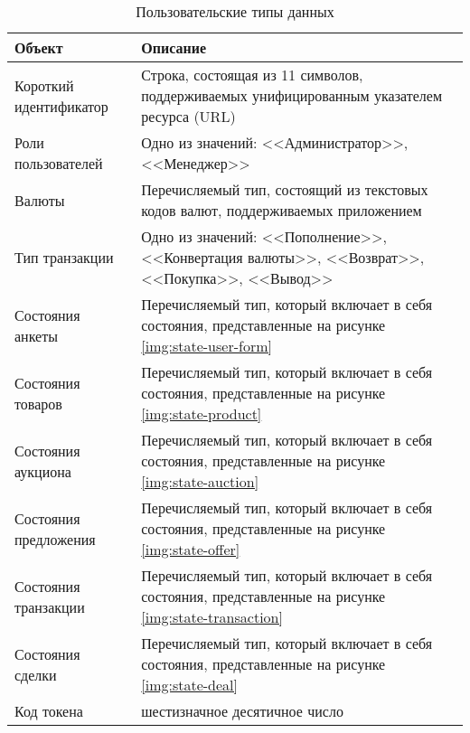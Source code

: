 \begin{table}[!th]
    \centering
    \caption{Пользовательские типы данных}
    \label{tab:db-types}
    \begin{tabular}{|p{5cm}|p{11cm}|}
         \hline
         \textbf{Объект} & \textbf{Описание} \\
         \hline
         Короткий идентификатор & Строка, состоящая из 11 символов, поддерживаемых унифицированным указателем ресурса (URL) \\
         \hline
         Роли пользователей & Одно из значений: <<Администратор>>, <<Менеджер>> \\
         \hline
         Валюты & Перечисляемый тип, состоящий из текстовых кодов валют, поддерживаемых приложением \\
         \hline
         Тип транзакции & Одно из значений: <<Пополнение>>, <<Конвертация валюты>>, <<Возврат>>, <<Покупка>>, <<Вывод>> \\
         \hline
         Состояния анкеты & Перечисляемый тип, который включает в себя состояния, представленные на рисунке \ref{img:state-user-form} \\
         \hline
         Состояния товаров & Перечисляемый тип, который включает в себя состояния, представленные на рисунке \ref{img:state-product} \\
         \hline
         Состояния аукциона & Перечисляемый тип, который включает в себя состояния, представленные на рисунке \ref{img:state-auction} \\
         \hline
         Состояния предложения & Перечисляемый тип, который включает в себя состояния, представленные на рисунке \ref{img:state-offer} \\
         \hline
         Состояния транзакции & Перечисляемый тип, который включает в себя состояния, представленные на рисунке \ref{img:state-transaction} \\
         \hline
          Состояния сделки & Перечисляемый тип, который включает в себя состояния, представленные на рисунке \ref{img:state-deal} \\
         \hline
         Код токена & шестизначное десятичное число \\
         \hline
    \end{tabular}
\end{table}


